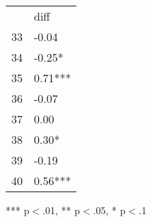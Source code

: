 \documentclass{article}
\begin{document}
\begin{table}[!h]
\centering
\begin{tabular}{ll}
\cline{1-2}
\multicolumn{1}{|l}{} &
  \multicolumn{1}{|l|}{diff} \\
\cline{1-2}
\multicolumn{1}{|l}{33} &
  \multicolumn{1}{|l|}{-0.04} \\
\cline{1-2}
\multicolumn{1}{|l}{34} &
  \multicolumn{1}{|l|}{-0.25*} \\
\cline{1-2}
\multicolumn{1}{|l}{35} &
  \multicolumn{1}{|l|}{0.71***} \\
\cline{1-2}
\multicolumn{1}{|l}{36} &
  \multicolumn{1}{|l|}{-0.07} \\
\cline{1-2}
\multicolumn{1}{|l}{37} &
  \multicolumn{1}{|l|}{0.00} \\
\cline{1-2}
\multicolumn{1}{|l}{38} &
  \multicolumn{1}{|l|}{0.30*} \\
\cline{1-2}
\multicolumn{1}{|l}{39} &
  \multicolumn{1}{|l|}{-0.19} \\
\cline{1-2}
\multicolumn{1}{|l}{40} &
  \multicolumn{1}{|l|}{0.56***} \\
\cline{1-2}
\end{tabular}

\footnotesize{
*** p$<$.01, ** p$<$.05, * p$<$.1
}
\end{table}
\end{document}
